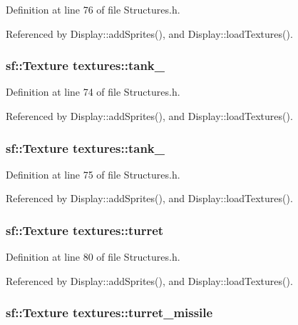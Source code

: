 Definition at line 76 of file Structures.\-h.



Referenced by Display\-::add\-Sprites(), and Display\-::load\-Textures().

\hypertarget{structtextures_a9287e247a5d108ed875b7b5b89ded524}{
\subsubsection[{tank\-\_\-1}]{\setlength{\rightskip}{0pt plus 5cm}sf\-::\-Texture textures\-::tank\-\_}}\label{structtextures_a9287e247a5d108ed875b7b5b89ded524}


Definition at line 74 of file Structures.\-h.



Referenced by Display\-::add\-Sprites(), and Display\-::load\-Textures().

\hypertarget{structtextures_a3322b3f064640afe1a4ebdb53636b71d}{
\subsubsection[{tank\-\_\-2}]{\setlength{\rightskip}{0pt plus 5cm}sf\-::\-Texture textures\-::tank\-\_}}\label{structtextures_a3322b3f064640afe1a4ebdb53636b71d}


Definition at line 75 of file Structures.\-h.



Referenced by Display\-::add\-Sprites(), and Display\-::load\-Textures().

\hypertarget{structtextures_a8454a0f97657e68ca0076f19c4de6236}{
\subsubsection[{turret}]{\setlength{\rightskip}{0pt plus 5cm}sf\-::\-Texture textures\-::turret}}\label{structtextures_a8454a0f97657e68ca0076f19c4de6236}


Definition at line 80 of file Structures.\-h.



Referenced by Display\-::add\-Sprites(), and Display\-::load\-Textures().

\hypertarget{structtextures_aa9ff61d80b32b3520308d8df61a8ea3f}{
\subsubsection[{turret\-\_\-missile}]{\setlength{\rightskip}{0pt plus 5cm}sf\-::\-Texture textures\-::turret\-\_\-missile}}\label{structtextures_aa9ff61d80b32b3520308d8df61a8ea3f}


